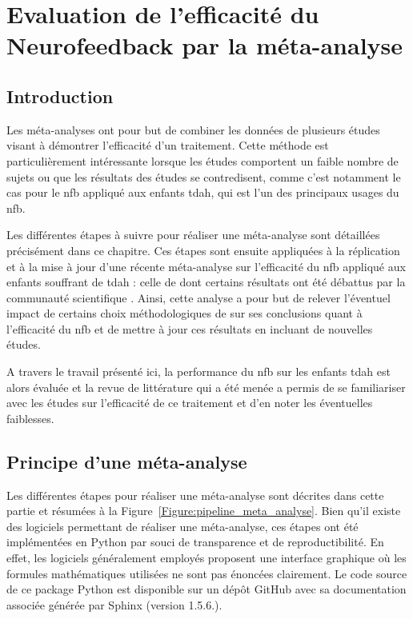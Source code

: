 \chapter{Evaluation de l'efficacité du Neurofeedback par la méta-analyse} \label{chapitre-2}

\section*{Introduction}
Les méta-analyses ont pour but de combiner les données de plusieurs études visant à démontrer l'efficacité d'un traitement. Cette méthode est
particulièrement intéressante lorsque les études comportent un faible nombre de sujets ou que les résultats des études se contredisent, 
comme c'est notamment le cas pour le \gls{nfb} appliqué aux enfants \gls{tdah}, qui est l'un des principaux usages du \gls{nfb}. 

Les différentes étapes à suivre pour réaliser une méta-analyse sont détaillées précisément dans ce chapitre.
Ces étapes sont ensuite appliquées à la réplication et à la mise à jour d'une récente méta-analyse sur l'efficacité du \gls{nfb} appliqué aux enfants 
souffrant de \gls{tdah} :
celle de \citet{Cortese2016} dont certains résultats ont été débattus par la communauté scientifique \citep{Micoulaud2016}. Ainsi, cette analyse a pour but
de relever l'éventuel impact de certains choix méthodologiques de \citet{Cortese2016} sur ses conclusions quant à l'efficacité du \gls{nfb} et de mettre à jour
ces résultats en incluant de nouvelles études. 

A travers le travail présenté ici, la performance du \gls{nfb} sur les enfants \gls{tdah} est alors évaluée et la revue de littérature
qui a été menée a permis de se familiariser avec les études sur l'efficacité de ce traitement et d'en noter les éventuelles faiblesses.

\newpage

\section{Principe d'une méta-analyse} \label{methods}

Les différentes étapes pour réaliser une méta-analyse sont décrites dans cette partie et résumées à la Figure~\ref{Figure:pipeline_meta_analyse}. 
Bien qu'il existe des logiciels permettant de réaliser une méta-analyse, ces étapes ont été implémentées en Python par souci de transparence et de reproductibilité. 
En effet, les logiciels généralement employés proposent une interface graphique où les formules mathématiques utilisées ne sont pas énoncées clairement. Le code source de ce package 
Python est disponible sur un dépôt GitHub \citep{Bussalb2019clinical} avec sa documentation associée générée par Sphinx (version 1.5.6.).

